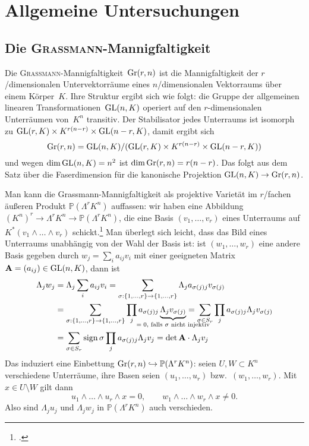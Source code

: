 \chapter{Allgemeine Untersuchungen} \label{chap:general}
\section{Die \textsc{Grassmann}-Mannigfaltigkeit} \label{sec:grassmann}
Die \textsc{Grassmann}-Mannigfaltigkeit~$\grass r/n$ ist die Mannigfaltigkeit der $r$\-/dimensionalen Untervektorräume eines $n$\-/dimensionalen Vektorraums über einem Körper~$K$. Ihre Struktur ergibt sich wie folgt: die Gruppe der allgemeinen linearen Transformationen~$\mathrm{GL}(n,K)$ operiert auf den $r$-dimensionalen Unterräumen von~$K^n$ transitiv. Der Stabilisator jedes Unterraums ist isomorph zu $\mathrm{GL}(r,K) \times K^{r(n-r)} \times \mathrm{GL}(n-r,K)$, damit ergibt sich
\begin{equation}
\grass r/n = \GL nK / (\GL rK \times K^{r(n-r)} \times \GL{n-r}K)
\end{equation}
und wegen $\dim \mathrm{GL}(n,K) = n^2$ ist $\dim \grass r/n = r(n-r)$. Das folgt aus dem Satz über die Faserdimension für die kanonische Projektion $\GL nK \to \grass r/n$.

Man kann die Grassmann-Mannigfaltigkeit als projektive Varietät im $r$\-/fachen äußeren Produkt $\mathbb P(\Lambda^r K^n)$ auffassen: wir haben eine Abbildung $(K^n)^r \to \Lambda^r K^n \to \mathbb P(\Lambda^r K^n)$, die eine Basis $(v_1, \dots, v_r)$ eines Unterraums auf $K^*(v_1 \wedge \dots \wedge v_r)$ schickt.\footcite[siehe hierzu auch][S.~42]{Shafarevich} Man überlegt sich leicht, dass das Bild eines Unterraums unabhängig von der Wahl der Basis ist: ist $(w_1, \dots, w_r)$ eine andere Basis gegeben durch $w_j = \sum_i a_{ij} v_i$ mit einer geeigneten Matrix $\mathbf{A} = (a_{ij}) \in \mathrm{GL}(n,K)$, dann ist
\begin{align*}
\Lambda_j w_j &= \Lambda_j \sum_i a_{ij} v_i = \sum_{\sigma: \{1,\dots,r\} \rightarrow \{1,\dots,r\}} \Lambda_j a_{\sigma(j)j} v_{\sigma(j)} \\
	&= \sum_{\sigma: \{1,\dots,r\} \rightarrow \{1,\dots,r\}} \prod_j a_{\sigma(j)j} \wunderbrace{\Lambda_j v_{\sigma(j)}}_{$= 0$, falls $\sigma$ nicht injektiv} = \sum_{\sigma \in S_r} \prod_j a_{\sigma(j)j} \Lambda_j v_{\sigma(j)} \\
	&= \sum_{\sigma \in S_r} \sign \sigma \prod_j a_{\sigma(j)j} \Lambda_j v_j = \det \mat A \cdot \Lambda_j v_j
\end{align*}
Das induziert eine Einbettung $\grass r/n \into \mathbb P(\Lambda^r K^n)$: seien $U, W \subset K^n$ verschiedene Unterräume, ihre Basen seien $(u_1, \dots, u_r)$ bzw.~$(w_1, \dots, w_r)$. Mit~$x \in U \setminus W$ gilt dann
\begin{equation*}
u_1 \wedge \dots \wedge u_r \wedge x = 0, \qquad w_1 \wedge \dots \wedge w_r \wedge x \neq 0.
\end{equation*}
Also sind $\Lambda_j u_j$ und $\Lambda_j w_j$ in $\mathbb P(\Lambda^r K^n)$ auch verschieden.

